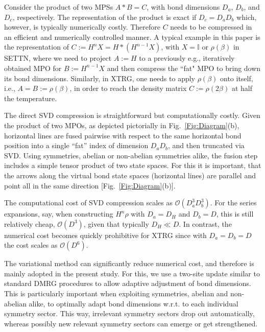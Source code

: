 \documentclass[aps,prx,twocolumn,showpacs,psfig,superscriptaddress,longbibliography]{revtex4-1}
\newcommand{\order}[1]{\mathcal{O}{\left(#1\right)}}
\newcommand{\Fig}[1]{Fig.~\ref{#1}}
\begin{document}
Consider the product of two MPSs $A \ast B = C$, with bond
dimensions $D_a$, $D_b$, and $D_c$, respectively. The representation
of the product is exact if $D_c = D_a D_b$ which, however, is
typically numerically costly.  Therefore $C$ needs to be compressed
in an efficient and numerically controlled manner.  A typical
example in this paper is the representation of $C:= H^n X = H \ast
(H^{n-1} X)$, with $X=\mathbb{I}$ or $\rho(\beta)$ in SETTN, where
we need to project $A:=H$ to a previously e.g., iteratively obtained
MPO for $B:= H^{n-1} X$ and then compress the ``fat" MPO to bring
down its bond dimensions.  Similarly, in XTRG, one needs to apply
$\rho(\beta)$ onto itself, i.e., $A=B:=\rho(\beta)$, in order to
reach the density matrix $C:=\rho(2\beta)$ at half the temperature. 

The direct SVD compression is straightforward
\cite{Chen.b+:2017:SETTN} but computationally costly. Given the
product of two MPOs, as depicted pictorially in
\Fig{Fig:Diagram}(b), horizontal lines are fused pairwise  {with respect to} 
the same horizontal bond position into a single ``fat'' index of
dimension $D_a D_b$, and then truncated via SVD. Using symmetries,
abelian or non-abelian symmetries alike, the fusion step includes a
simple tensor product of two state spaces. For this it is important,
that the arrows along the virtual bond state spaces (horizontal
lines) are parallel and point all in the same direction
[\Fig{Fig:Diagram}(b)].

The computational cost of SVD compression scales as $\order{D_a^3
D_b^3}$.  For the series expansions, say, when constructing $H^n
\rho$ with $D_a=D_H$ and $D_b=D$, this is still relatively cheap,
$\order{D^3}$, given that typically $D_H \ll D$.  In contrast, the
numerical cost becomes quickly prohibitive for XTRG since with
$D_a=D_b=D$ the cost scales as $\order{D^6}$.
 
The variational method can significantly reduce numerical cost, and
therefore is mainly adopted in the present study.  For this, we use
a two-site update similar to standard DMRG procedures to allow
adaptive adjustment of bond dimensions.  This is particularly
important when exploiting symmetries, abelian and non-abelian alike,
to optimally adapt bond dimensions w.r.t. to each individual
symmetry sector.  This way, irrelevant symmetry sectors drop out
automatically, whereas possibly new relevant symmetry sectors can
emerge or get strengthened.
\end{document}
